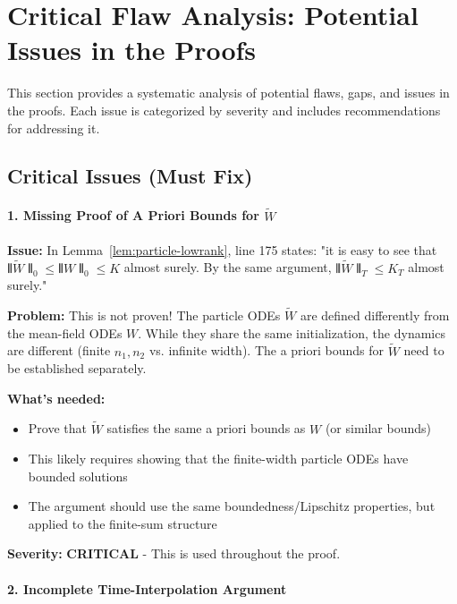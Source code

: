 \section{Critical Flaw Analysis: Potential Issues in the Proofs}
\label{sec:proof-flaws}

This section provides a systematic analysis of potential flaws, gaps, and issues in the proofs. Each issue is categorized by severity and includes recommendations for addressing it.

\subsection{Critical Issues (Must Fix)}

\paragraph*{1. Missing Proof of A Priori Bounds for $\tilde{W}$}

\textbf{Issue:} In Lemma~\ref{lem:particle-lowrank}, line 175 states: "it is easy to see that $\interleave\tilde{W}\interleave_0 \le \interleave W\interleave_0 \le K$ almost surely. By the same argument, $\interleave\tilde{W}\interleave_T \le K_T$ almost surely."

\textbf{Problem:} This is not proven! The particle ODEs $\tilde{W}$ are defined differently from the mean-field ODEs $W$. While they share the same initialization, the dynamics are different (finite $n_1, n_2$ vs. infinite width). The a priori bounds for $\tilde{W}$ need to be established separately.

\textbf{What's needed:}
\begin{itemize}
\item Prove that $\tilde{W}$ satisfies the same a priori bounds as $W$ (or similar bounds)
\item This likely requires showing that the finite-width particle ODEs have bounded solutions
\item The argument should use the same boundedness/Lipschitz properties, but applied to the finite-sum structure
\end{itemize}

\textbf{Severity:} \textbf{CRITICAL} - This is used throughout the proof.

\paragraph*{2. Incomplete Time-Interpolation Argument}

